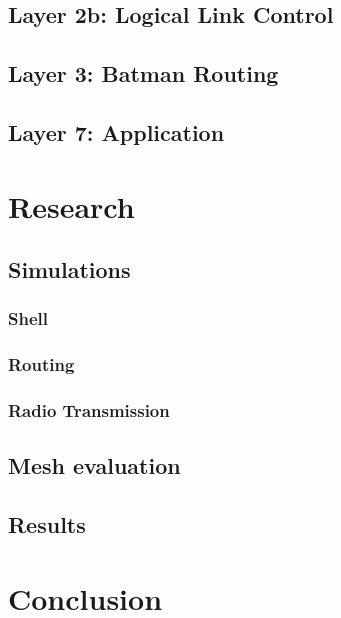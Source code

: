 \section{Layer 2b: Logical Link Control}
\section{Layer 3: Batman Routing}
\section{Layer 7: Application}

\chapter{Research}
\section{Simulations}
\subsection{Shell}
\subsection{Routing}
\subsection{Radio Transmission}
\section{Mesh evaluation}
\section{Results}

\chapter{Conclusion}
